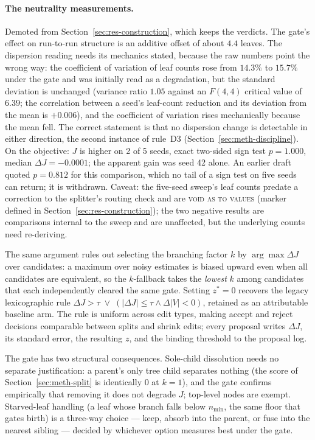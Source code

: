 \paragraph{The neutrality measurements.} Demoted from
Section~\ref{sec:res-construction}, which keeps the verdicts. The
gate's effect on run-to-run structure is an additive offset of about
$4.4$ leaves. The dispersion reading needs its mechanics stated,
because the raw numbers point the wrong way: the coefficient of
variation of leaf counts rose from $14.3\%$ to $15.7\%$ under the gate
and was initially read as a degradation, but the standard deviation is
unchanged (variance ratio $1.05$ against an $F(4,4)$ critical value of
$6.39$; the correlation between a seed's leaf-count reduction and its
deviation from the mean is $+0.006$), and the coefficient of variation
rises mechanically because the mean fell. The correct statement is
that no dispersion change is detectable in either direction, the
second instance of rule~D3 (Section~\ref{sec:meth-discipline}). On the
objective: $J$ is higher on 2 of 5 seeds, exact two-sided sign test
$p = 1.000$, median $\Delta J = -0.0001$; the apparent gain was seed
42 alone. An earlier draft quoted $p = 0.812$ for this comparison,
which no tail of a sign test on five seeds can return; it is
withdrawn. Caveat: the five-seed sweep's leaf counts predate a
correction to the splitter's routing check and are \textsc{void as to
values} (marker defined in Section~\ref{sec:res-construction}); the
two negative results are comparisons internal to the sweep and are
unaffected, but the underlying counts need re-deriving.

The same argument rules out selecting the branching factor $k$ by $\arg\max \Delta J$
over candidates: a maximum over noisy estimates is biased upward even when all
candidates are equivalent, so the $k$-fallback takes the \emph{lowest} $k$ among
candidates that each independently cleared the same gate.
Setting $z^{*} = 0$ recovers the legacy lexicographic rule
$\Delta J > \tau \;\vee\; (|\Delta J| \leq \tau \wedge \Delta|V| < 0)$, retained as an
attributable baseline arm. The rule is uniform across edit types, making accept and
reject decisions comparable between splits and shrink edits; every proposal writes
$\Delta J$, its standard error, the resulting $z$, and the binding threshold to the
proposal log.

The gate has two structural consequences.
Sole-child dissolution needs no separate justification: a parent's only tree child
separates nothing (the score of Section~\ref{sec:meth-split} is identically $0$ at
$k = 1$), and the gate confirms empirically that removing it does not degrade $J$;
top-level nodes are exempt.
Starved-leaf handling (a leaf whose branch falls below $n_{\min}$, the same floor that
gates birth) is a three-way choice --- keep, absorb into the parent, or fuse into the
nearest sibling --- decided by whichever option measures best under the gate.

